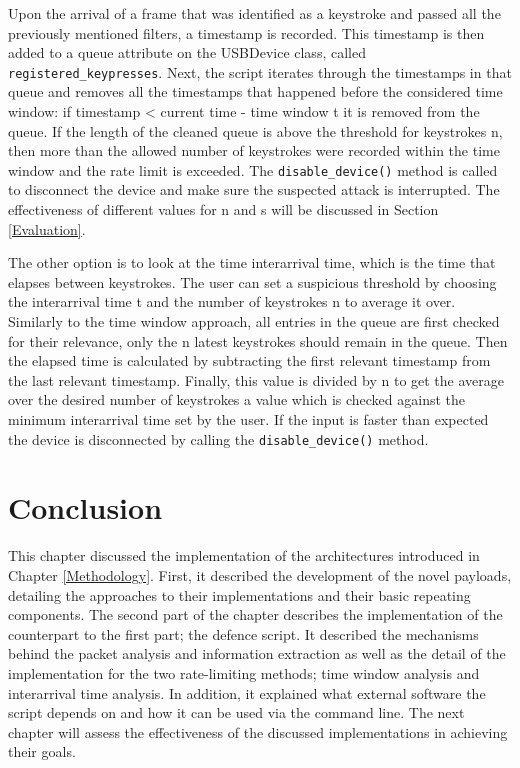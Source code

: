 Upon the arrival of a frame that was identified as a keystroke and passed all the previously mentioned filters, a timestamp is recorded. This timestamp is then added to a queue attribute on the USBDevice class, called \verb|registered_keypresses|. Next, the script iterates through the timestamps in that queue and removes all the timestamps that happened before the considered time window: if {timestamp < current time - time window t} it is removed from the queue. If the length of the cleaned queue is above the threshold for keystrokes n, then more than the allowed number of keystrokes were recorded within the time window and the rate limit is exceeded. The \verb|disable_device()| method is called to disconnect the device and make sure the suspected attack is interrupted. The effectiveness of different values for n and s will be discussed in Section \ref{Evaluation}. 


The other option is to look at the time interarrival time, which is the time that elapses between keystrokes. The user can set a suspicious threshold by choosing the interarrival time t and the number of keystrokes n to average it over. Similarly to the time window approach, all entries in the queue are first checked for their relevance, only the n latest keystrokes should remain in the queue. Then the elapsed time is calculated by subtracting the first relevant timestamp from the last relevant timestamp. Finally, this value is divided by n to get the average over the desired number of keystrokes a value which is checked against the minimum interarrival time set by the user. If the input is faster than expected the device is disconnected by calling the \verb|disable_device()| method. 




\section{Conclusion}

This chapter discussed the implementation of the architectures introduced in Chapter \ref{Methodology}. First, it described the development of the novel payloads, detailing the approaches to their implementations and their basic repeating components. The second part of the chapter describes the implementation of the counterpart to the first part; the defence script. It described the mechanisms behind the packet analysis and information extraction as well as the detail of the implementation for the two rate-limiting methods; time window analysis and interarrival time analysis. In addition, it explained what external software the script depends on and how it can be used via the command line. The next chapter will assess the effectiveness of the discussed implementations in achieving their goals.   


